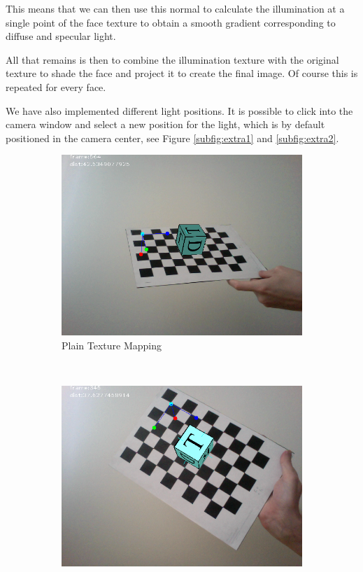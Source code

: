 This means that we can then use this normal to calculate the illumination at a single point of the face texture to obtain a smooth gradient corresponding to diffuse and specular light. 

All that remains is then to combine the illumination texture with the original texture to shade the face and project it to create the final image. Of course this is repeated for every face.

We have also implemented different light positions. It is possible to click into the camera window and select a new position for the light, which is by default positioned in the camera center, see Figure \ref{subfig:extra1} and \ref{subfig:extra2}. 

 \begin{figure}[h!]
	\begin{subfigure}[b]{0.5\textwidth}
		\includegraphics[width=\textwidth]{Handin3/images/texture2.png}
		\caption{Plain Texture Mapping}
		\label{subfig:plaintexture}
	\end{subfigure}
	~
	\begin{subfigure}[b]{0.5\textwidth}
		\includegraphics[width=\textwidth]{Handin3/images/flat.png}

\end{subfigure}
\end{figure}
